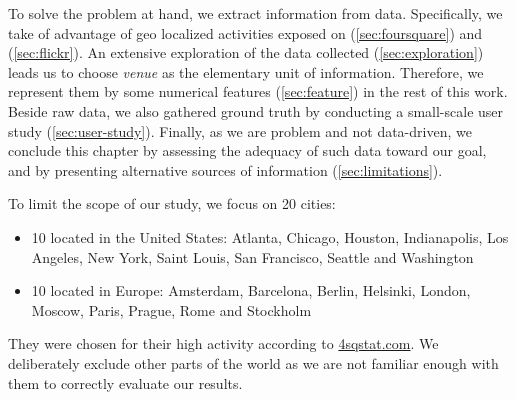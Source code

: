 To solve the problem at hand, we extract information from data. Specifically,
we take of advantage of geo localized activities exposed on \fs{}
(\autoref{sec:foursquare}) and \flickr{} (\autoref{sec:flickr}). An extensive
exploration of the data collected (\autoref{sec:exploration}) leads us to
choose \emph{venue} as the elementary unit of information. Therefore, we
represent them by some numerical features (\autoref{sec:feature}) in the rest
of this work. Beside raw data, we also gathered ground truth by conducting a
small-scale user study (\autoref{sec:user-study}). Finally, as we are problem
and not data-driven, we conclude this chapter by assessing the adequacy of such
data toward our goal, and by presenting alternative sources of information
(\autoref{sec:limitations}).

To limit the scope of our study, we focus on 20 cities:
\begin{itemize}
	\item 10 located in the United States: Atlanta, Chicago, Houston,
		Indianapolis, Los Angeles, New York, Saint Louis, San Francisco,
		Seattle and Washington
	\item 10 located in Europe: Amsterdam, Barcelona, Berlin, Helsinki, London,
		Moscow, Paris, Prague, Rome and Stockholm
\end{itemize}

They were chosen for their high activity according to
\href{http://www.4sqstat.com/}{4sqstat.com}. We deliberately exclude other
parts of the world as we are not familiar enough with them to correctly
evaluate our results.
